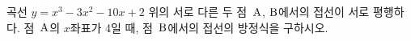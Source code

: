 곡선 $y=x^3-3x^2-10x+2$ 위의 서로 다른 두 점~$\mathrm{A}$, $\mathrm{B}$에서의 접선이 서로 평행하다. 점~$\mathrm{A}$의 $x$좌표가 4일 때, 점~$\mathrm{B}$에서의 접선의 방정식을 구하시오.
